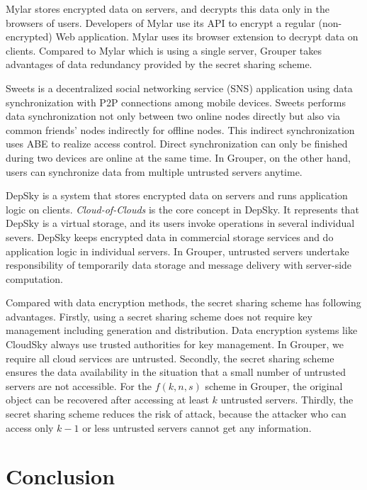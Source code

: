 \documentclass[twocolumn,10pt]{article}
\begin{document}
Mylar\cite{popa2014building} stores encrypted data on servers, and decrypts this data only in the browsers of users. 
Developers of Mylar use its API to encrypt a regular (non-encrypted) Web application. 
Mylar uses its browser extension to decrypt data on clients. 
Compared to Mylar which is using a single server, Grouper takes advantages of data redundancy provided by the secret sharing scheme.

Sweets\cite{sweets} is a decentralized social networking service (SNS) application using data synchronization with P2P connections among mobile devices. 
Sweets performs data synchronization not only between two online nodes directly but also via common friends' nodes indirectly for offline nodes.
This indirect synchronization uses ABE to realize access control.
Direct synchronization can only be finished during two devices are online at the same time. 
In Grouper, on the other hand, users can synchronize data from multiple untrusted servers anytime.

DepSky\cite{bessani2013depsky} is a system that stores encrypted data on servers and runs application logic on clients.
\emph{Cloud-of-Clouds} is the core concept in DepSky. 
It represents that DepSky is a virtual storage, and its users invoke operations in several individual severs. 
DepSky keeps encrypted data in commercial storage services and do application logic in individual servers.
In Grouper, untrusted servers undertake responsibility of temporarily data storage and message delivery with server-side computation.

Compared with data encryption methods, the secret sharing scheme has following advantages.
Firstly, using a secret sharing scheme does not require key management including generation and distribution.
Data encryption systems like CloudSky always use trusted authorities for key management.
In Grouper, we require all cloud services are untrusted.
Secondly, the secret sharing scheme ensures the data availability in the situation that a small number of untrusted servers are not accessible.
For the $f(k, n, s)$ scheme in Grouper, the original object can be recovered after accessing at least $k$ untrusted servers.
Thirdly, the secret sharing scheme reduces the risk of attack, because the attacker who can access only $k-1$ or less untrusted servers cannot get any information.

\section{Conclusion}
\end{document}
